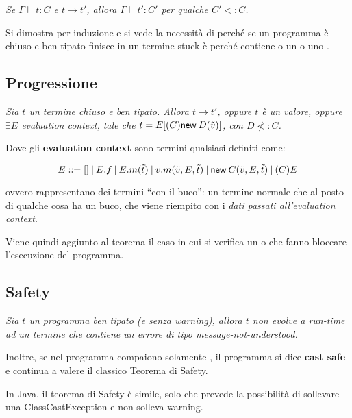 \begin{center}
	\textit{Se $\Gamma \vdash t : C$ e $t \to t'$, allora $\Gamma \vdash t' : C'$ per qualche $C' <:C$. }
\end{center}

Si dimostra per induzione e si vede la necessità di  perché se un programma è chiuso e ben tipato finisce in un termine stuck è perché contiene o un  o uno .

\subsection{Progressione}

\begin{center}
	\textit{Sia $t$ un termine chiuso e ben tipato. Allora $t \to t'$, oppure $t$ è un valore, oppure $\exists E$ \textit{evaluation context}, tale che $t = E[(C) \new{D}{\tilde{v}}]$, con $D \not<:C$.}
\end{center}

Dove gli \textbf{evaluation context} sono termini qualsiasi definiti come:

$$
E ::= [] \vbar E.f \vbar E.m(\tilde{t}) \vbar v.m(\tilde{v}, E, \tilde{t}) \vbar \new{C}{\tilde{v}, E, \tilde{t}} \vbar (C)E
$$

\noindent ovvero rappresentano dei termini ``con il buco'': un termine normale che al posto di qualche cosa ha un buco, che viene riempito con i \textit{dati passati all'evaluation context}.

Viene quindi aggiunto al teorema il caso in cui si verifica un  o  che fanno bloccare l'esecuzione del programma.


\subsection{Safety}

\begin{center}
	\textit{Sia $t$ un programma ben tipato (e senza warning), allora $t$ non evolve a run-time ad un termine che contiene un errore di tipo message-not-understood.}
\end{center}

Inoltre, se nel programma compaiono solamente , il programma si dice \textbf{cast safe} e continua a valere il classico Teorema di Safety.

In Java, il teorema di Safety è simile, solo che prevede la possibilità di sollevare una ClassCastException e non solleva warning.







